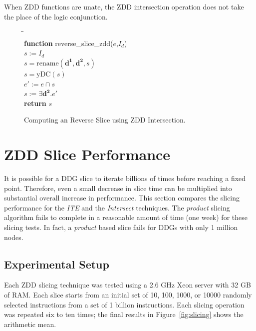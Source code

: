 \documentclass[defaultstyle,11pt]{thesis}
\begin{document}
When ZDD functions are unate, the ZDD intersection operation
does not take the place of the logic conjunction. 

\begin{figure}
\begin{center}
\begin{minipage}{1.5in}
\begin{tabbing}
\hspace{1em}\=\hspace{1em}\=\hspace{1em}\=\hspace{1em}\=\\
\textbf{function} reverse\_slice\_zdd($e$,$I_d$)\\
\>$s := I_d$\\
\>$s = \mathrm{rename}(\mathbf{d^1},\mathbf{d^2},s)$\\
\>$s = \mathrm{yDC}(s)$\\
\>$e' := e \cap s$\\
\>$s := \exists \mathbf{d^2}.e'$\\
\>\textbf{return} $s$
\end{tabbing}
\end{minipage}
\end{center}
\caption{Computing an Reverse Slice using ZDD Intersection.}
\label{fig:zddIntersectSlice}
\end{figure}

\section{ZDD Slice Performance}
\label{sec:zddsliceperf}

It is possible for a DDG slice to iterate billions of times before
reaching a fixed point.  Therefore, even a small decrease in slice
time can be multiplied into substantial overall increase in
performance.  This section compares the slicing performance for the
\textit{ITE} and the \textit{Intersect} techniques.  The
\textit{product} slicing algorithm fails to complete in a reasonable
amount of time (one week) for these slicing tests.  In fact, a
\textit{product} based slice fails for DDGs with only 1 million nodes.

\subsection {Experimental Setup}

Each ZDD slicing technique was tested using a 2.6 GHz Xeon server with
32 GB of RAM.  Each slice starts from an initial set of 10, 100, 1000,
or 10000 randomly selected instructions from a set of 1 billion
instructions. Each slicing operation was repeated six to ten times;
the final results in Figure~\ref{fig:slicing} shows the arithmetic
mean.
\end{document}
